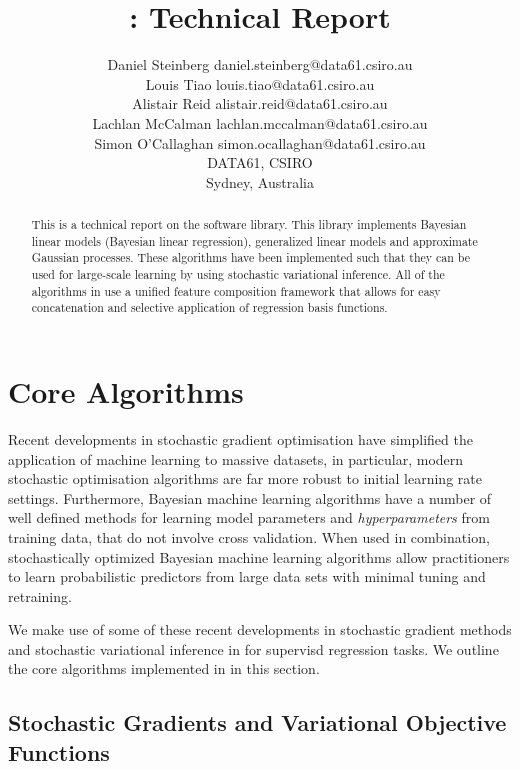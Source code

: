 \documentclass[11pt, oneside]{article}
\title{\revrand{}: Technical Report}
\author{\name Daniel Steinberg \email daniel.steinberg@data61.csiro.au \\
        \name Louis Tiao \email louis.tiao@data61.csiro.au \\
        \name Alistair Reid \email alistair.reid@data61.csiro.au \\
        \name Lachlan McCalman \email lachlan.mccalman@data61.csiro.au \\
        \name Simon O'Callaghan \email simon.ocallaghan@data61.csiro.au \\
        \addr DATA61, CSIRO \\
        Sydney, Australia}
\date{}
\begin{document}
\maketitle

\begin{abstract}
    This is a technical report on the \revrand{} software library. This
    library implements Bayesian linear models (Bayesian linear regression),
    generalized linear models and approximate Gaussian processes. These
    algorithms have been implemented such that they can be used for large-scale
    learning by using stochastic variational inference. All of the algorithms
    in \revrand{} use a unified feature composition framework that allows
    for easy concatenation and selective application of regression basis
    functions.
\end{abstract}

\tableofcontents

\section{Core Algorithms}

Recent developments in stochastic gradient optimisation have simplified the
application of machine learning to massive datasets, in particular, modern
stochastic optimisation algorithms are far more robust to initial learning rate
settings. Furthermore, Bayesian machine learning algorithms have a number of
well defined methods for learning model parameters and \emph{hyperparameters}
from training data, that do not involve cross validation. When used in
combination, stochastically optimized Bayesian machine learning algorithms
allow practitioners to learn probabilistic predictors from large data sets with
minimal tuning and retraining.

We make use of some of these recent developments in stochastic gradient methods
and stochastic variational inference in \revrand{} for supervisd regression
tasks. We outline the core algorithms implemented in \revrand{} in this section.

\subsection{Stochastic Gradients and Variational Objective Functions}
\label{sub:stochvar}
\end{document}
